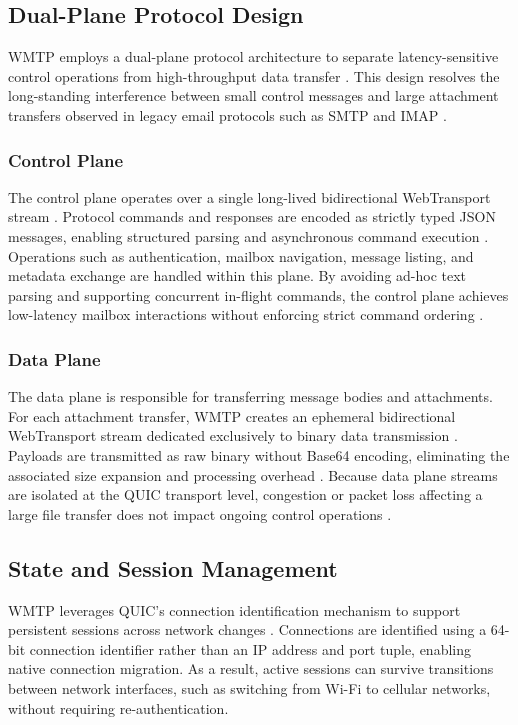 \documentclass[10pt,a4paper]{article}
\begin{document}
\subsection{Dual-Plane Protocol Design}

WMTP employs a dual-plane protocol architecture to separate
latency-sensitive control operations from high-throughput data
transfer \cite{quic, webtransport}. This design resolves the
long-standing interference between small control messages
and large attachment transfers observed in legacy email
protocols such as SMTP and IMAP \cite{smtp, imap, base64}.

\subsubsection{Control Plane}

The control plane operates over a single long-lived
bidirectional WebTransport stream \cite{webtransport}.
Protocol commands and responses are encoded as strictly
typed JSON messages, enabling structured parsing and
asynchronous command execution \cite{jmap}. Operations such
as authentication, mailbox navigation, message listing, and
metadata exchange are handled within this plane. By avoiding
ad-hoc text parsing and supporting concurrent in-flight
commands, the control plane achieves low-latency mailbox
interactions without enforcing strict command ordering
\cite{quic, jmap}.

\subsubsection{Data Plane}

The data plane is responsible for transferring message bodies
and attachments. For each attachment transfer, WMTP creates
an ephemeral bidirectional WebTransport stream dedicated
exclusively to binary data transmission \cite{webtransport}.
Payloads are transmitted as raw binary without Base64
encoding, eliminating the associated size expansion and
processing overhead \cite{base64}. Because data plane streams
are isolated at the QUIC transport level, congestion or packet
loss affecting a large file transfer does not impact ongoing
control operations \cite{quic}.

\subsection{State and Session Management}

WMTP leverages QUIC’s connection identification mechanism
to support persistent sessions across network changes
\cite{quic}. Connections are identified using a 64-bit
connection identifier rather than an IP address and port tuple,
enabling native connection migration. As a result, active
sessions can survive transitions between network interfaces,
such as switching from Wi-Fi to cellular networks, without
requiring re-authentication.
\end{document}
